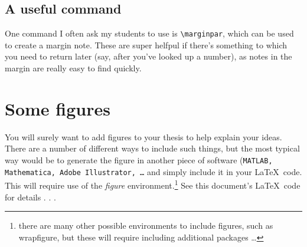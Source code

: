 \subsection{A useful command}

One command I often ask my students to use is \texttt{\textbackslash marginpar}, which can be used to create a margin note.  These are super helfpul if there's something to which you need to return later (say, after you've looked up a number), as notes in the margin are really easy to find quickly.  

\section{Some figures}

You will surely want to add figures to your thesis to help explain your ideas.  There are a number of different ways to include such things, but the most typical way would be to generate the figure in another piece of software (\texttt{MATLAB, Mathematica, Adobe Illustrator, \ldots} and simply include it in your \LaTeX ~code.  This will require use of the \emph{figure} environment.\footnote{there are many other possible environments to include figures, such as wrapfigure, but these will require including additional packages \ldots}  See this document's \LaTeX ~code for details . . .


